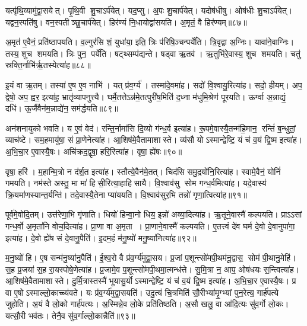 यत्पृ॑थि॒व्यामु॑द्वा॒सयेत्। 
पृ॒थि॒वी शु॒चाऽर्प॑येत्। 
यद॒प्सु। 
अ॒पः  शु॒चार्प॑येत्। 
यदोष॑धीषु। 
ओष॑धीः  शु॒चाऽर्प॑येत्। 
यद्वन॒स्पति॑षु। 
वन॒स्पतीञ्छु॒चार्प॑येत्। 
हिर॑ण्यं नि॒धायोद्वा॑सयति। 
अ॒मृतं॒ वै हिर॑ण्यम्॥८७॥

अ॒मृत॑ ए॒वैनं॒ प्रति॑ष्ठापयति। 
व॒ल्गुर॑सि शं॒ युधा॑या॒ इति॒ त्रिः प॑रिषि॒ञ्चन्पर्ये॑ति। 
त्रि॒वृद्वा अ॒ग्निः। 
यावा॑ने॒वाग्निः। 
तस्य॒ शुच शमयति। 
त्रिः पुन॒ पर्ये॑ति। 
षट्थ्सम्प॑द्यन्ते। 
षड्वा ऋ॒तव॑। 
ऋ॒तुभि॑रे॒वास्य॒ शुच शमयति। 
चतु॑ स्रक्ति॒र्नाभि॑र्\mbox{}ऋ॒तस्येत्या॑ह॥८८॥

इ॒यं वा ऋ॒तम्। 
तस्या॑ ए॒ष ए॒व नाभि॑। 
यत् प्र॑व॒र्ग्य॑। 
तस्मा॑दे॒वमा॑ह। 
सदो॑ वि॒श्वायु॒रित्या॑ह। 
सदो॒ हीयम्। 
अप॒ द्वेषो॒ अप॒ ह्वर॒ इत्या॑ह॒ भ्रातृ॑व्यापनुत्त्यै। 
घर्मै॒तत्तेऽन्न॑मे॒तत्पुरी॑ष॒मिति॑ द॒ध्ना म॑धुमि॒श्रेण॑ पूरयति। 
ऊर्ग्वा अ॒न्नाद्यं॒ दधि॑। 
ऊ॒र्जैवैन॑म॒न्नाद्ये॑न॒ सम॑र्द्धयति॥८९॥

अन॑शनायुको भवति। 
य ए॒वं वेद॑। 
रन्ति॒र्नामा॑सि दि॒व्यो ग॑न्ध॒र्व इत्या॑ह। 
रू॒पमे॒वास्यै॒तन्म॑हि॒मान॒ रन्तिं॑ ब॒न्धुतां॒ व्याच॑ष्टे। 
सम॒हमायु॑षा॒ सं प्रा॒णेनेत्या॑ह। 
आ॒शिष॑मे॒वैतामाशास्ते। 
व्य॑सौ योऽस्मान्द्वेष्टि॒ यं च॑ व॒यं द्वि॒ष्म इत्या॑ह। 
अ॒भि॒चा॒र ए॒वास्यै॒षः। 
अचि॑क्रद॒द्वृषा॒ हरि॒रित्या॑ह। 
वृषा॒ ह्ये॑षः॥९०॥

वृषा॒ हरि॑। 
म॒हान्मि॒त्रो न द॑र्\mbox{}श॒त इत्या॑ह। 
स्तौत्ये॒वैन॑मे॒तत्। 
चिद॑सि समु॒द्रयो॑नि॒रित्या॑ह। 
स्वामे॒वैनं॒ योनिं॑ गमयति। 
नम॑स्ते अस्तु॒ मा मा॑ हिसी॒रित्या॒हाहिसायै। 
वि॒श्वाव॑सु सोम गन्ध॒र्वमित्या॑ह। 
यदे॒वास्य॑ क्रि॒यमा॑णस्यान्त॒र्यन्ति॑। 
तदे॒वास्यै॒तेना प्या॑ययति। 
वि॒श्वाव॑सुर॒भि तन्नो॑ गृणा॒त्वि\-त्या॑ह॥९१॥

पूर्व॑मे॒वोदि॒तम्। 
उत्त॑रेणा॒भि गृ॑णाति। 
धियो॑ हिन्वा॒नो धिय॒ इन्नो॑ अव्या॒दित्या॑ह। 
ऋ॒तूने॒वास्मै॑ कल्पयति। 
प्राऽऽसां गन्ध॒र्वो अ॒मृता॑नि वोच॒दित्या॑ह। 
प्रा॒णा वा अ॒मृता। 
प्रा॒णाने॒वास्मै॑ कल्पयति। 
ए॒तत्त्वं दे॑व घर्म दे॒वो दे॒वानुपा॑गा॒ इत्या॑ह। 
दे॒वो ह्ये॑ष सं दे॒वानु॒पैति॑। 
इ॒दम॒हं म॑नु॒ष्यो॑ मनु॒ष्या॑नित्या॑ह॥९२॥

म॒नु॒ष्यो॑ हि। 
ए॒ष सन्म॑नु॒ष्या॑नु॒पैति॑। 
ई॒श्व॒रो वै प्र॑व॒र्ग्य॑मुद्वा॒सय\sn{}। 
प्र॒जां प॒शून्त्सो॑मपी॒थम॑नू॒द्वास॒ सोम॑ पी॒थानु॒मेहि॑। 
स॒ह प्र॒जया॑ स॒ह रा॒यस्पोषे॒णेत्या॑ह। 
प्र॒जामे॒व प॒शून्त्सो॑मपी॒थमा॒त्मन्ध॑त्ते। 
सु॒मि॒त्रा न॒ आप॒ ओष॑धयः स॒न्त्वित्या॑ह। 
आ॒शिष॑मे॒वैतामाशास्ते। 
दु॒र्मि॒त्रास्तस्मै॑ भूयासु॒र्योऽस्मान्द्वेष्टि॒ यं च॑ व॒यं द्वि॒ष्म इत्या॑ह। 
अ॒भि॒चा॒र ए॒वास्यै॒षः। 
प्र वा ए॒षोऽस्माल्लो॒काच्च्य॑वते। 
यः प्र॑व॒र्ग्य॑मुद्वा॒सयति॑। 
उदु॒त्यं चि॒त्रमिति॑ सौ॒रीभ्या॑मृ॒ग्भ्यां पुन॒रेत्य॒ गार्\mbox{}ह॑पत्ये जुहोति। 
अ॒यं वै लो॒को गार्\mbox{}ह॑पत्यः। 
अ॒स्मिन्ने॒व लो॒के प्रति॑तिष्ठति। 
अ॒सौ खलु॒ वा आ॑दि॒त्यः सु॑व॒र्गो लो॒कः। 
यत्सौ॒री भव॑तः। 
तेनै॒व सु॑व॒र्गाल्लो॒कान्नैति॑॥९३॥
\anuvakamend[ब्रह्म॑णस्त्वा पर॒स्पाया॒ इत्या॑ह दधात्य॒न्वित्य॑ रक्ष॒स्वी रक्ष॑सा॒मप॑हत्यै॒ वै हिर॑ण्यमाहार्द्धयति॒ ह्ये॑ष गृ॑णा॒त्वित्या॑ह मनु॒ष्या॑नित्या॑हास्यै॒षोऽष्टौ च॑]

